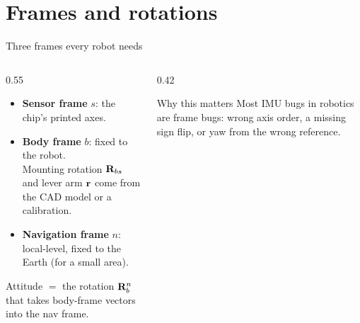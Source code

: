 \section{Frames and rotations}

\begin{frame}{Three frames every robot needs}
  \begin{columns}[T]
    \begin{column}{0.55\textwidth}
      \begin{itemize}
        \item \textbf{Sensor frame} $s$: the chip's printed axes.
        \item \textbf{Body frame} $b$: fixed to the robot.\\
          Mounting rotation $\mathbf{R}_{bs}$ and lever arm $\mathbf{r}$ come from the CAD model or a calibration.
        \item \textbf{Navigation frame} $n$: local-level, fixed to the Earth (for a small area).
      \end{itemize}
      \vspace{0.5em}
      Attitude $=$ the rotation $\mathbf{R}^n_b$ that takes body-frame vectors into the nav frame.
    \end{column}
    \begin{column}{0.42\textwidth}
      \begin{block}{Why this matters}
        \small Most IMU bugs in robotics are frame bugs: wrong axis order, a missing sign flip, or yaw from the wrong reference.
      \end{block}
    \end{column}
  \end{columns}
\end{frame}

